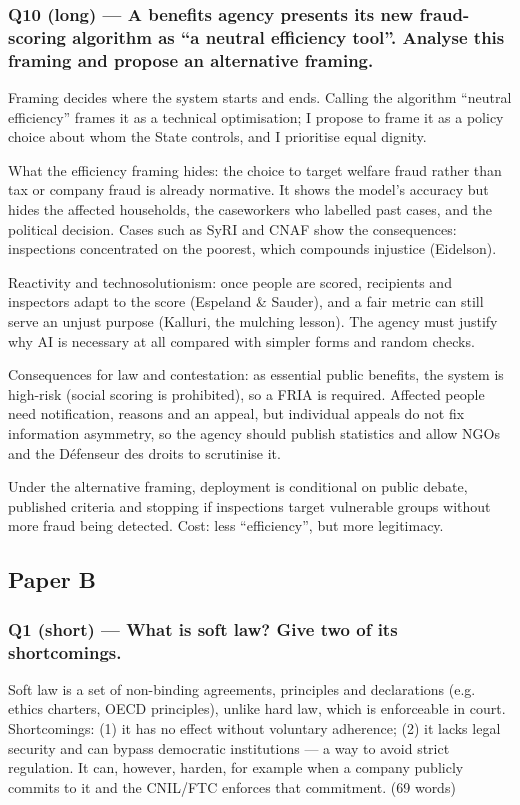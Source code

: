 \documentclass[11pt,a4paper]{article}
\newcommand{\blk}[1]{{\setlength{\fboxsep}{2pt}\colorbox{ink}{\sffamily\footnotesize\bfseries\color{white}\,#1\,}}}
\begin{document}
\subsubsection*{Q10 (long) — A benefits agency presents its new fraud-scoring algorithm as “a neutral efficiency tool”. Analyse this framing and propose an alternative framing.}
\begin{description}[leftmargin=1.2cm,style=sameline]
\item[\blk{F}] Framing decides where the system starts and ends. Calling the algorithm “neutral efficiency” frames it as a technical optimisation; I propose to frame it as a policy choice about whom the State controls, and I prioritise equal dignity.
\item[\blk{A1}] What the efficiency framing hides: the choice to target welfare fraud rather than tax or company fraud is already normative. It shows the model’s accuracy but hides the affected households, the caseworkers who labelled past cases, and the political decision. Cases such as SyRI and CNAF show the consequences: inspections concentrated on the poorest, which compounds injustice (Eidelson).
\item[\blk{A2}] Reactivity and technosolutionism: once people are scored, recipients and inspectors adapt to the score (Espeland \& Sauder), and a fair metric can still serve an unjust purpose (Kalluri, the mulching lesson). The agency must justify why AI is necessary at all compared with simpler forms and random checks.
\item[\blk{A3}] Consequences for law and contestation: as essential public benefits, the system is high-risk (social scoring is prohibited), so a FRIA is required. Affected people need notification, reasons and an appeal, but individual appeals do not fix information asymmetry, so the agency should publish statistics and allow NGOs and the Défenseur des droits to scrutinise it.
\item[\blk{R}] Under the alternative framing, deployment is conditional on public debate, published criteria and stopping if inspections target vulnerable groups without more fraud being detected. Cost: less “efficiency”, but more legitimacy.
\end{description}
\subsection{Paper B}
\subsubsection*{Q1 (short) — What is soft law? Give two of its shortcomings.}
Soft law is a set of non-binding agreements, principles and declarations (e.g. ethics charters, OECD principles), unlike hard law, which is enforceable in court. Shortcomings: (1) it has no effect without voluntary adherence; (2) it lacks legal security and can bypass democratic institutions — a way to avoid strict regulation. It can, however, harden, for example when a company publicly commits to it and the CNIL/FTC enforces that commitment. {\small\color{gray}(69 words)}
\end{document}
